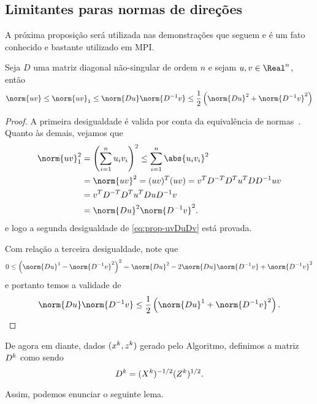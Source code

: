\subsection{Limitantes paras normas de direções} 

A próxima proposição será utilizada nas demonstrações que seguem e é um fato conhecido e bastante utilizado em \ac{MPI}.

\begin{prop}\label{prop:norm-uv}
	Seja $D$ uma matriz diagonal não-singular de ordem $n$ e sejam $u,v\in\Real^n$, então 
	\begin{equation}
		\label{eq:prop-uvDuDv}
		\norm{uv}\leq \norm{uv}_1 \leq \norm{Du}\norm{D^{-1}v} \leq \frac{1}{2}\left(\norm{Du}^{2} + \norm{D^{-1}v}^{2}\right)
	\end{equation}
\end{prop}
\begin{proof} A primeira desigualdade é valida por conta da equivalência de normas~\cite{Golub:1996wp}. Quanto às demais, vejamos que 
	\begin{align*}
		\norm{uv}_1^{2} & = \left( \sum_{i=1}^{n}u_i v_i  \right)^{2} \leq  \sum_{i=1}^{n}\abs{u_iv_i}^{2}\\
						& = \norm{uv}^{2} = (uv)^{T}(uv)  = v^{T}D^{-T}D^{T}u^{T}DD^{-1} uv\\
						& = v^{T}D^{-T}D^{T}u^{T}DuD^{-1}v\\
						& = \norm{Du}^{2}\norm{D^{-1}v}^{2}.
	\end{align*}
e logo a segunda desigualdade de \eqref{eq:prop-uvDuDv} está provada. 

Com relação a terceira desigualdade, note que  
\[
0 \leq \left(\norm{Du}^{1} - \norm{D^{-1}v}^{2}\right)^{2} = \norm{Du}^{2} - 2\norm{Du}\norm{D^{-1}v} + \norm{D^{-1}v}^{2}
\]
e portanto temos a validade de
\[
\norm{Du}\norm{D^{-1}v} \leq \frac{1}{2}\left(\norm{Du}^{1} + \norm{D^{-1}v}^{2}\right). \qedhere
\]
\end{proof}

De agora em diante, dados $(x^{k},z^{k})$ gerado pelo Algoritmo, definimos a matriz $D^{k}$ como sendo
\[
D^{k} =(X^{k})^{-1/2}(Z^{k})^{1/2}.
\]

Assim, podemos enunciar o seguinte lema.

